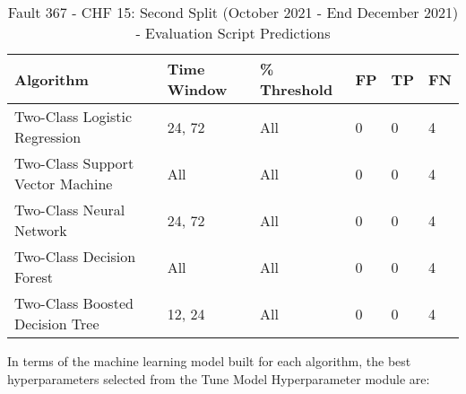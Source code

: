 \begin{table}[!ht]
    \centering
    \begin{tabular}{|l|l|l|l|l|l|}
    \hline
        Algorithm & Time Window & \% Threshold & FP & TP & FN \\ \hline
        Two-Class Logistic Regression & 24, 72 & All & 0 & 0 & 4 \\ \hline
        Two-Class Support Vector Machine & All & All & 0 & 0 & 4 \\ \hline
        Two-Class Neural Network & 24, 72 & All & 0 & 0 & 4 \\ \hline
        Two-Class Decision Forest & All & All & 0 & 0 & 4 \\ \hline
        Two-Class Boosted Decision Tree & 12, 24 & All & 0 & 0 & 4 \\ \hline
    \end{tabular}
    \caption{Fault 367 - CHF 15: Second Split (October 2021 - End December 2021) - Evaluation Script Predictions}
    \label{9112_SCA34_1st}
\end{table}

In terms of the machine learning model built for each algorithm, the best hyperparameters selected from the Tune Model Hyperparameter module are:

